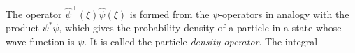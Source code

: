 The operator $\hat\psi^+(\xi)\hat\psi(\xi)$ is formed from the $\psi$-operators
in analogy with the product $\psi^*\psi$, which gives the probability density
of a particle in a state whose wave function is $\psi$. It is called the
particle \emph{density operator}. The integral
